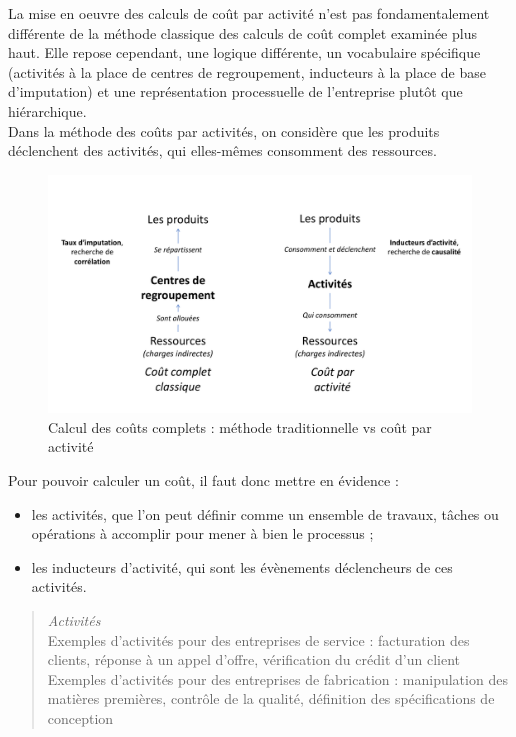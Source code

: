 \documentclass{tufte-handout}
\begin{document}
\begin{enumerate}
La mise en oeuvre des calculs de coût par activité n'est pas fondamentalement différente de la méthode classique des calculs de coût complet examinée plus haut. Elle repose cependant, une logique différente, un vocabulaire spécifique (activités à la place de centres de regroupement, inducteurs à la place de base d'imputation) et une représentation processuelle de l’entreprise plutôt que hiérarchique.\\

Dans la méthode des coûts par activités, on considère que les produits déclenchent des activités, qui elles-mêmes consomment des ressources.\\

\begin{figure}[htbp]
\centering
\includegraphics[width=.9\linewidth]{./img/abc.pdf}
\caption{Calcul des coûts complets : méthode traditionnelle vs coût par activité}
\end{figure}

Pour pouvoir calculer un coût, il faut donc mettre en évidence :\\
\begin{itemize}
\item les activités, que l'on peut définir comme un ensemble de travaux, tâches ou opérations à accomplir pour mener à bien le processus ;\\
\item les inducteurs d'activité, qui sont les évènements déclencheurs de ces activités.\\
\end{itemize}

\begin{quote}
\emph{Activités}\\
Exemples d'activités pour des entreprises de service : facturation des clients, réponse à un appel d’offre, vérification du crédit d’un client\\
Exemples d'activités pour des entreprises de fabrication : manipulation des matières premières, contrôle de la qualité, définition des spécifications de conception\\
\end{quote}


\end{enumerate}
\end{document}
